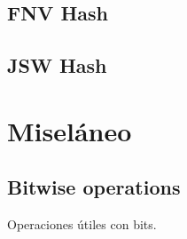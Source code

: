 \documentclass[10pt,letterpaper,twocolumn,twosided]{article}
\newcommand{\codigofuente}[1]{

\dotfill
}
\begin{document}
\subsection{FNV Hash}

\subsection{JSW Hash}

\section{Miseláneo}

\subsection {Bitwise operations}
Operaciones útiles con bits.

\codigofuente{../src/bitwise.${EXT}}
\end{document}
